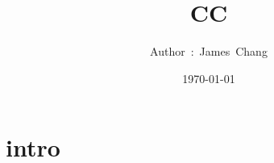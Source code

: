 

\title{CC}
\author{ {\Biohazard} \hspace{1.5mm} \hspace{1.5mm} Author\ :\ James\ Chang}
\date{\today}


\large

\tableofcontents

\chapter{intro}





